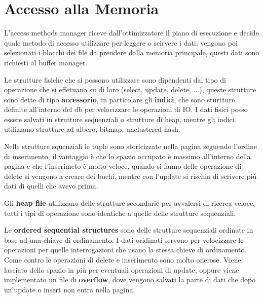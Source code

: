 \documentclass[12pt]{article}
\begin{document}
\section{Accesso alla Memoria}
L'access methods manager riceve dall'ottimizzatore il piano di esecuzione e decide quale metodo di accesso utilizzare per leggere o scirvere i dati, vengono poi selezionati i blocchi dei file da prendere dalla memoria principale, questi dati sono richiesti al buffer manager.

Le strutture fisiche che si possono utilizzare sono dipendenti dal tipo di operazione che si effetuano su di loro (select, update, delete, ...), queste strutture sono dette di tipo \textbf{accessorio}, in particolare gli \textbf{indici}, che sono sturtture definite all'interno del db per velocizzare le operazioni di IO. I dati fisici posso essere salvati in strutture sequenziali o strutture di heap, mentre gli indici utilizzano strutture ad albero, bitmap, unclustered hash.

Nelle strutture squenziali le tuple sono storicizzate nella pagina seguendo l'ordine di inserimento, il vantaggio \`e che lo spazio occupato \`e massimo all'interno della pagina e che l'inserimeto \`e molto veloce, quando si fanno delle operazione di delete si vengono a creare dei buchi, mentre con l'update si rischia di scrivere pi\`u dati di quelli che avevo prima.

Gli \textbf{heap file} utilizzano delle strutture secondarie per avvalersi di ricerca veloce, tutti i tipi di operazione sono identiche a quelle delle strutture sequenziali.

Le \textbf{ordered sequential structures} sono delle strutture sequenziali ordinate in base ad una chiave di ordinamento. I dati oridinati servono per velocizzare le operazioni per quelle interrogazioni che usano la stessa chieve di ordinamento. Come contro le operazioni di delete e inserimento sono molto onerose. Viene lasciato dello spazio in pi\`u per eventuali operazioni di update, oppure viene implementato un file di \textbf{overflow}, dove vengono salvati la parte di dati che dopo un'update o insert non entra nella pagina.
\end{document}
